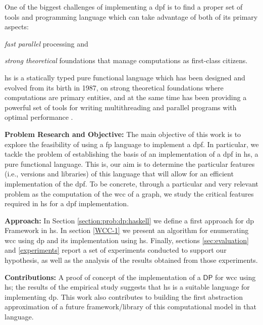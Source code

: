 \documentclass[preprint]{elsarticle}
\newcommand{\DP}{\mathsf{DP}}
\begin{document}
One of the biggest challenges of implementing a \acrfull{dpf} is to find a proper set of tools and programming language which can take advantage of both of its primary aspects: \begin{inparaenum}[i\upshape)]
\item  \emph{fast parallel} processing and 
\item  \emph{strong theoretical} foundations that manage computations as first-class citizens.
 \end{inparaenum}
\acrfull{hs} is a statically typed pure functional language which has been designed and evolved from its birth in 1987, on strong theoretical foundations where computations are primary entities, and at the same time has been providing a powerful set of tools for writing multithreading and parallel programs with optimal performance \cite{parallelbook, monadpar}.

\textbf{Problem Research and Objective:}\label{research:obj} The main objective of this work is to explore the feasibility of using a  \acrfull{fp} language to implement a \acrshort{dpf}. In particular, we tackle the problem of establishing the basis of an implementation of a \acrshort{dpf}  in \acrshort{hs}, a pure functional language. This is,  our aim is to determine the particular features (i.e., versions and libraries) of this language that will allow for an efficient implementation of the \acrshort{dpf}. To be concrete, through a particular and very relevant problem as the computation of the \acrfull{wcc} of a graph,  we study the  critical features required  in \acrshort{hs} for a \acrshort{dpf} implementation.

\textbf{Approach:}  In Section \ref{section:prob:dp:haskell} we define a first approach for \acrshort{dp} Framework in \acrshort{hs}. In section \ref{WCC-1} we present an algorithm for enumerating \acrshort{wcc} using \acrshort{dp} and its implementation using  \acrshort{hs}. Finally, sections \ref{sec:evaluation} and \ref{experiments} report a set of experiments conducted to support our hypothesis, as well as the analysis of the results obtained from those experiments.

\textbf{Contributions:} A proof of concept of the implementation of a $\DP$ for \acrshort{wcc} using \acrshort{hs}; the results of the empirical study suggests that   \acrshort{hs} is a suitable language for implementing \acrshort{dp}. This work also contributes to building the first abstraction approximation of a future framework/library of this computational model in that language. 
\end{document}
